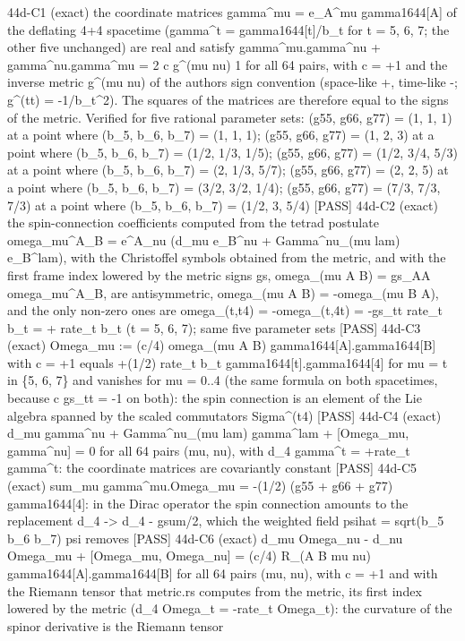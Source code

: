 \documentclass[
  10pt,
]{article}
\newenvironment{Shaded}{}{}
\newcommand{\NormalTok}[1]{#1}
\begin{document}
\begin{Shaded}
\begin{Highlighting}[]
\NormalTok{[PASS] 44d{-}C1  (exact) the coordinate matrices gamma\^{}mu = e\_A\^{}mu gamma1644[A] of the deflating 4+4 spacetime (gamma\^{}t = gamma1644[t]/b\_t for t = 5, 6, 7; the other five unchanged) are real and satisfy gamma\^{}mu.gamma\^{}nu + gamma\^{}nu.gamma\^{}mu = 2 c g\^{}(mu nu) 1 for all 64 pairs, with c = +1 and the inverse metric g\^{}(mu nu) of the author\textquotesingle{}s sign convention (space{-}like +, time{-}like {-}; g\^{}(tt) = {-}1/b\_t\^{}2). The squares of the matrices are therefore equal to the signs of the metric. Verified for five rational parameter sets: (g55, g66, g77) = (1, 1, 1) at a point where (b\_5, b\_6, b\_7) = (1, 1, 1); (g55, g66, g77) = (1, 2, 3) at a point where (b\_5, b\_6, b\_7) = (1/2, 1/3, 1/5); (g55, g66, g77) = (1/2, 3/4, 5/3) at a point where (b\_5, b\_6, b\_7) = (2, 1/3, 5/7); (g55, g66, g77) = (2, 2, 5) at a point where (b\_5, b\_6, b\_7) = (3/2, 3/2, 1/4); (g55, g66, g77) = (7/3, 7/3, 7/3) at a point where (b\_5, b\_6, b\_7) = (1/2, 3, 5/4)}
\NormalTok{[PASS] 44d{-}C2  (exact) the spin{-}connection coefficients computed from the tetrad postulate omega\_mu\^{}A\_B = e\^{}A\_nu (d\_mu e\_B\^{}nu + Gamma\^{}nu\_(mu lam) e\_B\^{}lam), with the Christoffel symbols obtained from the metric, and with the first frame index lowered by the metric signs gs, omega\_(mu A B) = gs\_AA omega\_mu\^{}A\_B, are antisymmetric, omega\_(mu A B) = {-}omega\_(mu B A), and the only non{-}zero ones are omega\_(t,t4) = {-}omega\_(t,4t) = {-}gs\_tt rate\_t b\_t = + rate\_t b\_t (t = 5, 6, 7); same five parameter sets}
\NormalTok{[PASS] 44d{-}C3  (exact) Omega\_mu := (c/4) omega\_(mu A B) gamma1644[A].gamma1644[B] with c = +1 equals +(1/2) rate\_t b\_t gamma1644[t].gamma1644[4] for mu = t in \{5, 6, 7\} and vanishes for mu = 0..4 (the same formula on both spacetimes, because c gs\_tt = {-}1 on both): the spin connection is an element of the Lie algebra spanned by the scaled commutators Sigma\^{}(t4)}
\NormalTok{[PASS] 44d{-}C4  (exact) d\_mu gamma\^{}nu + Gamma\^{}nu\_(mu lam) gamma\^{}lam + [Omega\_mu, gamma\^{}nu] = 0 for all 64 pairs (mu, nu), with d\_4 gamma\^{}t = +rate\_t gamma\^{}t: the coordinate matrices are covariantly constant}
\NormalTok{[PASS] 44d{-}C5  (exact) sum\_mu gamma\^{}mu.Omega\_mu = {-}(1/2) (g55 + g66 + g77) gamma1644[4]: in the Dirac operator the spin connection amounts to the replacement d\_4 {-}\textgreater{} d\_4 {-} gsum/2, which the weighted field psihat = sqrt(b\_5 b\_6 b\_7) psi removes}
\NormalTok{[PASS] 44d{-}C6  (exact) d\_mu Omega\_nu {-} d\_nu Omega\_mu + [Omega\_mu, Omega\_nu] = (c/4) R\_(A B mu nu) gamma1644[A].gamma1644[B] for all 64 pairs (mu, nu), with c = +1 and with the Riemann tensor that metric.rs computes from the metric, its first index lowered by the metric (d\_4 Omega\_t = {-}rate\_t Omega\_t): the curvature of the spinor derivative is the Riemann tensor}

\end{Highlighting}
\end{Shaded}
\end{document}
